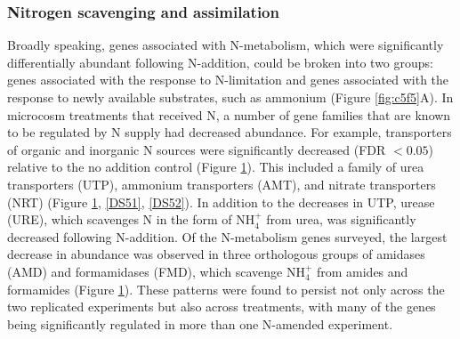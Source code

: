 \begin{figure}[p!]
  \label{fig:c5f4}
\end{figure}

\subsubsection{Nitrogen scavenging and assimilation}

Broadly speaking, genes associated with N-metabolism, which were significantly differentially abundant following N-addition, could be broken into two groups: genes associated with the response to N-limitation and genes associated with the response to newly available substrates, such as ammonium (Figure \ref{fig:c5f5}A). In microcosm treatments that received N, a number of gene families that are known to be regulated by N supply had decreased abundance.  For example, transporters of organic and inorganic N sources were significantly decreased (FDR $< 0.05$) relative to the no addition control (Figure \ref{fig:c5f4}). This included a family of urea transporters (UTP), ammonium transporters (AMT), and nitrate transporters (NRT) (Figure \ref{fig:c5f4}, \ref{DS51}, \ref{DS52}). In addition to the decreases in UTP, urease (URE), which scavenges N in the form of NH$_{4}^+$ from urea, was significantly decreased following N-addition. Of the N-metabolism genes surveyed, the largest decrease in abundance was observed in three orthologous groups of amidases (AMD) and formamidases (FMD), which scavenge NH$_{4}^+$ from amides and formamides (Figure \ref{fig:c5f4}). These patterns were found to persist not only across the two replicated experiments but also across treatments, with many of the genes being significantly regulated in more than one N-amended experiment. \par

